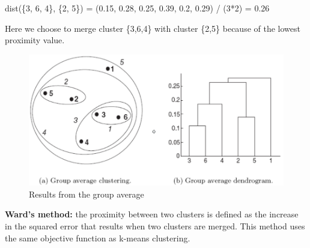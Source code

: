 		{\color{orange} dist(\{3, 6, 4\}, \{2, 5\}) = (0.15, 0.28, 0.25, 0.39, 0.2, 0.29) / (3*2) = 0.26}

		Here we choose to merge cluster \{3,6,4\} with cluster \{2,5\} because of the lowest
		proximity value. 


			\begin{figure}[H]
				\centering
				\includegraphics[scale=0.3]{pics/average.png}
				\caption{Results from the group average}
			\end{figure}

		{\bf Ward's method:} the proximity between two clusters is defined as the increase in 
		the squared error that results when two clusters are merged. This method uses the same
		objective function as k-means clustering. 
			
